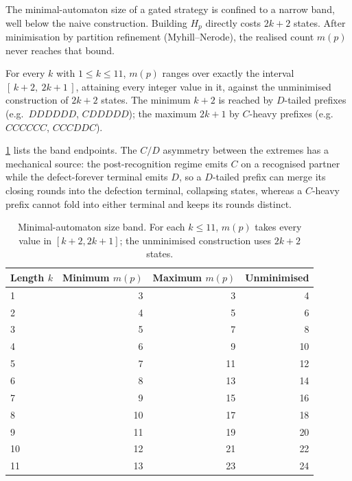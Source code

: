 The minimal-automaton size of a gated strategy is confined to a narrow band, well below the
naive construction. Building $H_p$ directly costs $2k+2$ states. After minimisation by
partition refinement (Myhill--Nerode), the realised count $m(p)$ never reaches that bound.

\begin{observation}\label{obs:band}
For every $k$ with $1\le k\le 11$, $m(p)$ ranges over exactly the interval $[\,k+2,\ 2k+1\,]$,
attaining every integer value in it, against the unminimised construction of $2k+2$ states.
The minimum $k+2$ is reached by $D$-tailed prefixes (e.g.\ $DDDDDD$, $CDDDDD$); the maximum
$2k+1$ by $C$-heavy prefixes (e.g.\ $CCCCCC$, $CCCDDC$).
\end{observation}

\cref{tab:autoband} lists the band endpoints. The $C/D$ asymmetry between the extremes has a
mechanical source: the post-recognition regime emits $C$ on a recognised partner while the
defect-forever terminal emits $D$, so a $D$-tailed prefix can merge its closing rounds into the defection
terminal, collapsing states, whereas a $C$-heavy prefix cannot fold into either terminal and
keeps its rounds distinct.

\begin{table}[t]
  \centering
  \caption{Minimal-automaton size band. For each $k\le 11$, $m(p)$ takes every value in
  $[k+2,2k+1]$; the unminimised construction uses $2k+2$ states.}
  \label{tab:autoband}
  \begin{tabular}{lrrr}
    \toprule
    Length $k$ & Minimum $m(p)$ & Maximum $m(p)$ & Unminimised \\
    \midrule
    1  & 3  & 3  & 4  \\
    2  & 4  & 5  & 6  \\
    3  & 5  & 7  & 8  \\
    4  & 6  & 9  & 10 \\
    5  & 7  & 11 & 12 \\
    6  & 8  & 13 & 14 \\
    7  & 9  & 15 & 16 \\
    8  & 10 & 17 & 18 \\
    9  & 11 & 19 & 20 \\
    10 & 12 & 21 & 22 \\
    11 & 13 & 23 & 24 \\
    \bottomrule
  \end{tabular}
\end{table}

